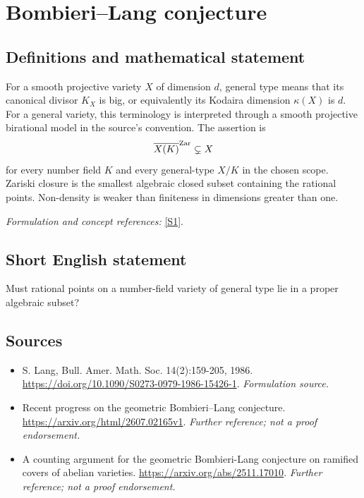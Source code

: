 \documentclass[11pt]{article}
\begin{document}
\section*{\texorpdfstring{Bombieri–Lang conjecture}{Bombieri–Lang conjecture}}\label{9400081}
\subsection{Definitions and mathematical statement}
For a smooth projective variety $X$ of dimension $d$, general type means that its canonical divisor $K_X$ is big, or equivalently its Kodaira dimension $\kappa(X)$ is $d$. For a general variety, this terminology is interpreted through a smooth projective birational model in the source's convention. The assertion is
\[
 \overline{X(K)}^{\rm Zar}\subsetneq X
\]
for every number field $K$ and every general-type $X/K$ in the chosen scope. Zariski closure is the smallest algebraic closed subset containing the rational points. Non-density is weaker than finiteness in dimensions greater than one.
\par\smallskip\textit{Formulation and concept references:} \href{https://doi.org/10.1090/S0273-0979-1986-15426-1}{[S1]}.

\subsection{Short English statement}
Must rational points on a number-field variety of general type lie in a proper algebraic subset?
\subsection{Sources}
\begin{itemize}
\item[S1]S. Lang, Bull. Amer. Math. Soc. 14(2):159-205, 1986.
\url{https://doi.org/10.1090/S0273-0979-1986-15426-1}.
\textit{Formulation source.}
\item[S2]Recent progress on the geometric Bombieri–Lang conjecture.
\url{https://arxiv.org/html/2607.02165v1}.
\textit{Further reference; not a proof endorsement.}
\item[S3]A counting argument for the geometric Bombieri-Lang conjecture on ramified covers of abelian varieties.
\url{https://arxiv.org/abs/2511.17010}.
\textit{Further reference; not a proof endorsement.}
\end{itemize}
\end{document}
